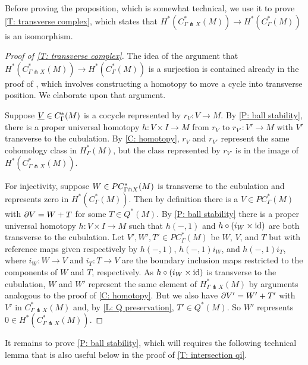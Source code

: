 Before proving the proposition, which is somewhat technical, we use it to prove \cref{T: transverse complex}, which states that $H^*(C^*_{\Gamma \pitchfork X}(M)) \to H^*(C_\Gamma^*(M))$ is an isomorphism.

\begin{proof}[Proof of \cref{T: transverse complex}]
	The idea of the argument that $H^*(C^*_{\Gamma \pitchfork X}(M)) \to H^*(C_\Gamma^*(M))$ is a surjection is contained already in the proof of \cite[Lemma 15]{Lipy14}, which involves constructing a homotopy to move a cycle into transverse position.
	We elaborate upon that argument.

Suppose $\underline{V} \in C_\Gamma^*(M)$ is a cocycle represented by $r_V \colon V \to M$. By \cref{P: ball stability}, there is a proper universal homotopy $h: V \times I \to M$ from $r_V$ to $r_{V'} \colon V' \to M$ with $V'$ transverse to the cubulation.
By \cref{C: homotopy}, $r_V$ and $r_{V'}$ represent the same cohomology class in $H^*_{\Gamma}(M)$, but the class represented by $r_{V'}$ is in the image of $H^*(C^*_{\Gamma \pitchfork X}(M))$.

For injectivity, suppose $W \in PC^*_{\Gamma\pitchfork X}(M)$ is transverse to the cubulation and represents zero in $H^*(C_\Gamma^*(M))$. Then by definition there is a $V \in PC^*_\Gamma(M)$ with $\partial V = W+T$ for some
	$T \in Q^*(M)$.
By \cref{P: ball stability} there is a proper universal homotopy $h \colon V \times I \to M$ such that $h(-,1)$ and $h\circ(i_{W} \times \mathrm{id})$ are both transverse to the cubulation.
Let $V', W',T' \in PC^*_\Gamma(M)$ be $W$, $V$, and $T$ but with reference maps given respectively by $h(-,1)$, $h(-,1)i_W$, and $h(-,1)i_T$, where $i_W \colon W \to V$ and $i_T:T \to V$ are the boundary inclusion maps restricted to the components of $W$ and $T$, respectively.
As $h\circ(i_{W} \times \mathrm{id})$ is transverse to the cubulation, $W$ and $W'$ represent the same element of $H^*_{\Gamma \pitchfork X}(M)$ by arguments analogous to the proof of \cref{C: homotopy}.
But we also have $\partial V' = W'+T'$ with $V'$ in $C^*_{\Gamma \pitchfork X}(M)$ and, by \cref{L: Q preservation}, $T' \in Q^*(M)$. So $W'$ represents $0 \in H^*(C^*_{\Gamma \pitchfork X}(M))$.
\end{proof}

It remains to prove \cref{P: ball stability}, which will requires the following technical lemma that is also useful below in the proof of \cref{T: intersection qi}.


